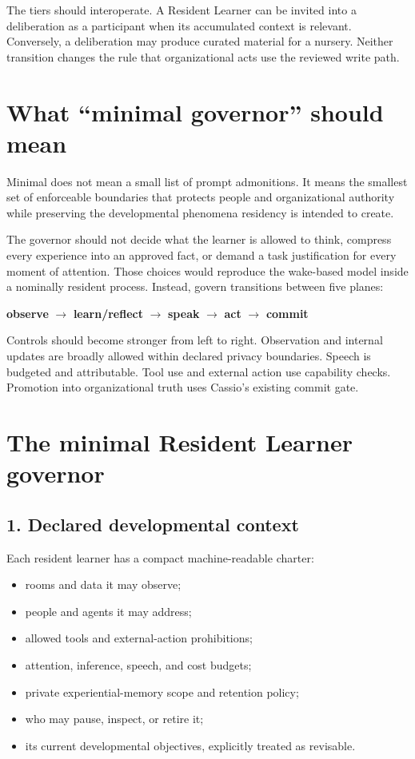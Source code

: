 \documentclass[11pt]{article}
\begin{document}
The tiers should interoperate. A Resident Learner can be invited into a
deliberation as a participant when its accumulated context is relevant.
Conversely, a deliberation may produce curated material for a nursery. Neither
transition changes the rule that organizational acts use the reviewed write
path.

\section{What ``minimal governor'' should mean}

Minimal does not mean a small list of prompt admonitions. It means the smallest
set of enforceable boundaries that protects people and organizational
authority while preserving the developmental phenomena residency is intended
to create.

The governor should not decide what the learner is allowed to think, compress
every experience into an approved fact, or demand a task justification for
every moment of attention. Those choices would reproduce the wake-based model
inside a nominally resident process. Instead, govern transitions between five
planes:

\begin{center}
\textbf{observe} $\rightarrow$ \textbf{learn/reflect} $\rightarrow$
\textbf{speak} $\rightarrow$ \textbf{act} $\rightarrow$ \textbf{commit}
\end{center}

Controls should become stronger from left to right. Observation and internal
updates are broadly allowed within declared privacy boundaries. Speech is
budgeted and attributable. Tool use and external action use capability checks.
Promotion into organizational truth uses Cassio's existing commit gate.

\section{The minimal Resident Learner governor}

\subsection{1. Declared developmental context}

Each resident learner has a compact machine-readable charter:

\begin{itemize}
  \item rooms and data it may observe;
  \item people and agents it may address;
  \item allowed tools and external-action prohibitions;
  \item attention, inference, speech, and cost budgets;
  \item private experiential-memory scope and retention policy;
  \item who may pause, inspect, or retire it;
  \item its current developmental objectives, explicitly treated as revisable.
\end{itemize}
\end{document}
